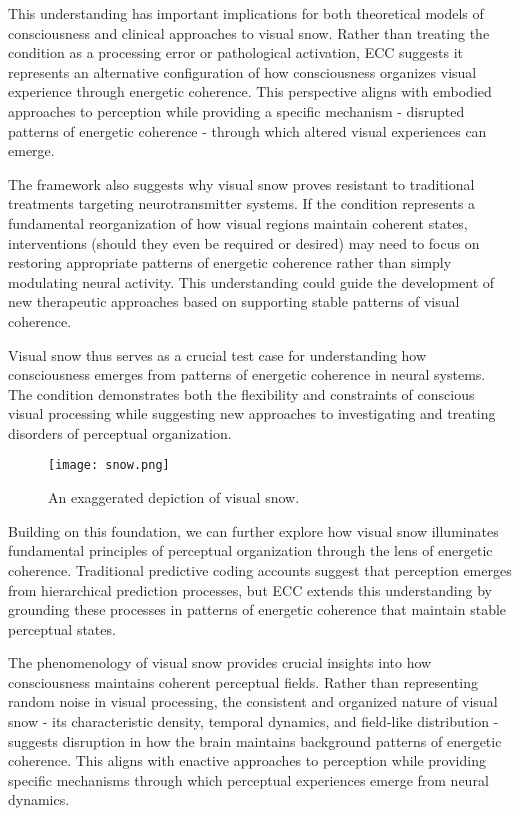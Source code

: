 \begin{refsection}
This understanding has important implications for both theoretical models of consciousness and clinical approaches to visual snow. Rather than treating the condition as a processing error or pathological activation, ECC suggests it represents an alternative configuration of how consciousness organizes visual experience through energetic coherence. This perspective aligns with embodied approaches to perception \cite{ORegan2001} while providing a specific mechanism - disrupted patterns of energetic coherence - through which altered visual experiences can emerge.

The framework also suggests why visual snow proves resistant to traditional treatments targeting neurotransmitter systems. If the condition represents a fundamental reorganization of how visual regions maintain coherent states, interventions (should they even be required or desired) may need to focus on restoring appropriate patterns of energetic coherence rather than simply modulating neural activity. This understanding could guide the development of new therapeutic approaches based on supporting stable patterns of visual coherence.

Visual snow thus serves as a crucial test case for understanding how consciousness emerges from patterns of energetic coherence in neural systems. The condition demonstrates both the flexibility and constraints of conscious visual processing while suggesting new approaches to investigating and treating disorders of perceptual organization.

\begin{figure}[h]
    \centering
    \texttt{[image: snow.png]}

    \caption{An exaggerated depiction of visual snow.}
\end{figure}

Building on this foundation, we can further explore how visual snow illuminates fundamental principles of perceptual organization through the lens of energetic coherence. Traditional predictive coding accounts \cite{Rao1999, Friston2009} suggest that perception emerges from hierarchical prediction processes, but ECC extends this understanding by grounding these processes in patterns of energetic coherence that maintain stable perceptual states.

The phenomenology of visual snow provides crucial insights into how consciousness maintains coherent perceptual fields. Rather than representing random noise in visual processing, the consistent and organized nature of visual snow - its characteristic density, temporal dynamics, and field-like distribution - suggests disruption in how the brain maintains background patterns of energetic coherence. This aligns with enactive approaches to perception \cite{Varela1991} while providing specific mechanisms through which perceptual experiences emerge from neural dynamics.


\end{refsection}

